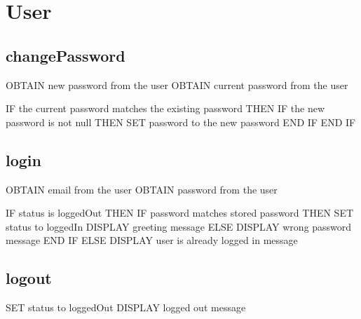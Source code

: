 \section{User}

\subsection{changePassword}
\begin{pc}
OBTAIN new password from the user
OBTAIN current password from the user

IF the current password matches the existing password THEN
	IF the new password is not null THEN
		SET password to the new password
	END IF
END IF
\end{pc}

\subsection{login}
\begin{pc}
OBTAIN email from the user
OBTAIN password from the user

IF status is loggedOut THEN
	IF password matches stored password THEN
		SET status to loggedIn
		DISPLAY greeting message
	ELSE
		DISPLAY wrong password message
	END IF
ELSE
	DISPLAY user is already logged in message
\end{pc}

\subsection{logout}
\begin{pc}
SET status to loggedOut
DISPLAY logged out message
\end{pc}
